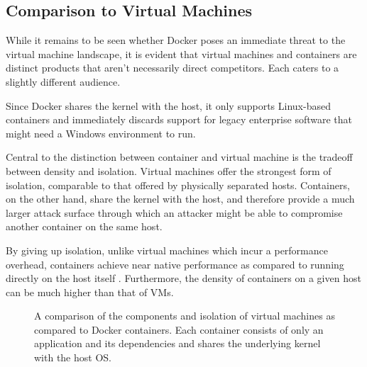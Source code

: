 \subsection{Comparison to Virtual Machines}
While it remains to be seen whether Docker poses an immediate threat to the virtual machine landscape, it is evident that virtual machines and containers are distinct products that aren't necessarily direct competitors. Each caters to a slightly different audience.

Since Docker shares the kernel with the host, it only supports Linux-based containers and immediately discards support for legacy enterprise software that might need a Windows environment to run.

Central to the distinction between container and virtual machine is the tradeoff between density and isolation. Virtual machines offer the strongest form of isolation, comparable to that offered by physically separated hosts. Containers, on the other hand, share the kernel with the host, and therefore provide a much larger attack surface through which an attacker might be able to compromise another container on the same host. 

By giving up isolation, unlike virtual machines which incur a performance overhead, containers achieve near native performance as compared to running directly on the host itself \cite{performance}. Furthermore, the density of containers on a given host can be much higher than that of VMs. 

\begin{figure}[h]
\centering
{}
\quad
\quad
{}
\caption{A comparison of the components and isolation of virtual machines as compared to Docker containers. Each container consists of only an application and its dependencies and shares the underlying kernel with the host OS.}
\label{fig:test}
\end{figure}

